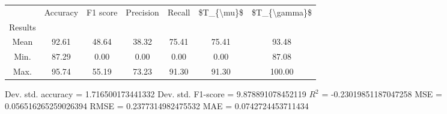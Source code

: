 \begin{tabular}{|c|c|c|c|c|c|c|}
\toprule
{} &  Accuracy &  F1 score &  Precision &  Recall &  \$T\_\{\textbackslash mu\}\$ &  \$T\_\{\textbackslash gamma\}\$ \\
Results &           &           &            &         &            &               \\
\hline
Mean    &     92.61 &     48.64 &      38.32 &   75.41 &      75.41 &         93.48 \\
Min.    &     87.29 &      0.00 &       0.00 &    0.00 &       0.00 &         87.08 \\
Max.    &     95.74 &     55.19 &      73.23 &   91.30 &      91.30 &        100.00 \\
\bottomrule
\end{tabular}

 Dev. std. accuracy = 1.716500173441332
 Dev. std. F1-score = 9.878891078452119
 $R^2$ = -0.23019851187047258
 MSE = 0.056516265259026394
 RMSE = 0.2377314982475532
 MAE = 0.0742724453711434